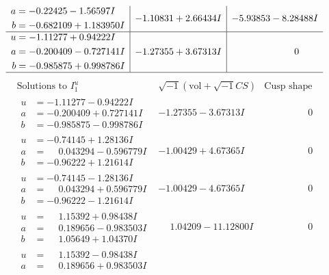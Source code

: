 \documentclass[1p]{elsarticle_modified}
\theoremstyle{definition}
\newcommand{\I}{\sqrt{-1}}
\begin{document}
$$\begin{array}{c|c|c}
\begin{aligned}
a &= -0.22425 - 1.56597 I \\
b &= -0.682109 + 1.183950 I\end{aligned}
 & -1.10831 + 2.66434 I & -5.93853 - 8.28488 I \\ \hline\begin{aligned}
u &= -1.11277 + 0.94222 I \\
a &= -0.200409 - 0.727141 I \\
b &= -0.985875 + 0.998786 I\end{aligned}
 & -1.27355 + 3.67313 I & \phantom{-0.000000 } 0\\
 \hline 
 \end{array}$$\newpage$$\begin{array}{c|c|c}  
\text{Solutions to }I^u_{1}& \I (\text{vol} + \sqrt{-1}CS) & \text{Cusp shape}\\
 \hline 
\begin{aligned}
u &= -1.11277 - 0.94222 I \\
a &= -0.200409 + 0.727141 I \\
b &= -0.985875 - 0.998786 I\end{aligned}
 & -1.27355 - 3.67313 I & \phantom{-0.000000 } 0 \\ \hline\begin{aligned}
u &= -0.74145 + 1.28136 I \\
a &= \phantom{-}0.043294 - 0.596779 I \\
b &= -0.96222 + 1.21614 I\end{aligned}
 & -1.00429 + 4.67365 I & \phantom{-0.000000 } 0 \\ \hline\begin{aligned}
u &= -0.74145 - 1.28136 I \\
a &= \phantom{-}0.043294 + 0.596779 I \\
b &= -0.96222 - 1.21614 I\end{aligned}
 & -1.00429 - 4.67365 I & \phantom{-0.000000 } 0 \\ \hline\begin{aligned}
u &= \phantom{-}1.15392 + 0.98438 I \\
a &= \phantom{-}0.189656 - 0.983503 I \\
b &= \phantom{-}1.05649 + 1.04370 I\end{aligned}
 & \phantom{-}1.04209 - 11.12800 I & \phantom{-0.000000 } 0 \\ \hline\begin{aligned}
u &= \phantom{-}1.15392 - 0.98438 I \\
a &= \phantom{-}0.189656 + 0.983503 I \\

\end{aligned}
\end{array}$$
\end{document}
